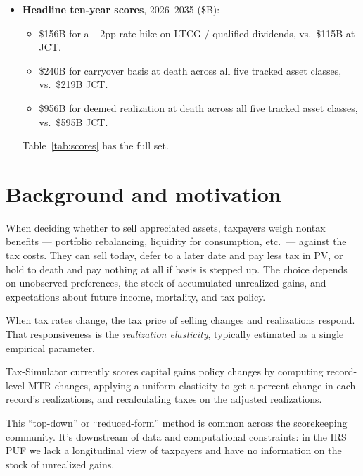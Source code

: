 \documentclass[11pt]{article}
\begin{document}
\begin{itemize}
  \item \textbf{Headline ten-year scores}, 2026--2035 (\$B):
    \begin{itemize}
       \item \$156B for a $+2$pp rate hike on LTCG / qualified dividends, vs.\ \$115B at JCT.
       \item \$240B for carryover basis at death across all five tracked asset classes, vs.\ \$219B JCT.
       \item \$956B for deemed realization at death across all five tracked asset classes, vs.\ \$595B JCT.
    \end{itemize}
    Table~\ref{tab:scores} has the full set.
\end{itemize}

\vspace{1ex}
\noindent\hrulefill

\section{Background and motivation}

When deciding whether to sell appreciated assets, taxpayers weigh nontax
benefits --- portfolio rebalancing, liquidity for consumption, etc.\ ---
against the tax costs. They can sell today, defer to a later date and
pay less tax in PV, or hold to death and pay nothing at all if basis is
stepped up. The choice depends on unobserved preferences, the stock of
accumulated unrealized gains, and expectations about future income,
mortality, and tax policy.

When tax rates change, the tax price of selling changes and realizations
respond. That responsiveness is the \textit{realization elasticity},
typically estimated as a single empirical parameter.

Tax-Simulator currently scores capital gains policy changes by computing
record-level MTR changes, applying a uniform elasticity to get a percent
change in each record's realizations, and recalculating taxes on the
adjusted realizations.

This ``top-down'' or ``reduced-form'' method is common across the
scorekeeping community. It's downstream of data and computational
constraints: in the IRS PUF we lack a longitudinal view of taxpayers and
have no information on the stock of unrealized gains.
\end{document}
